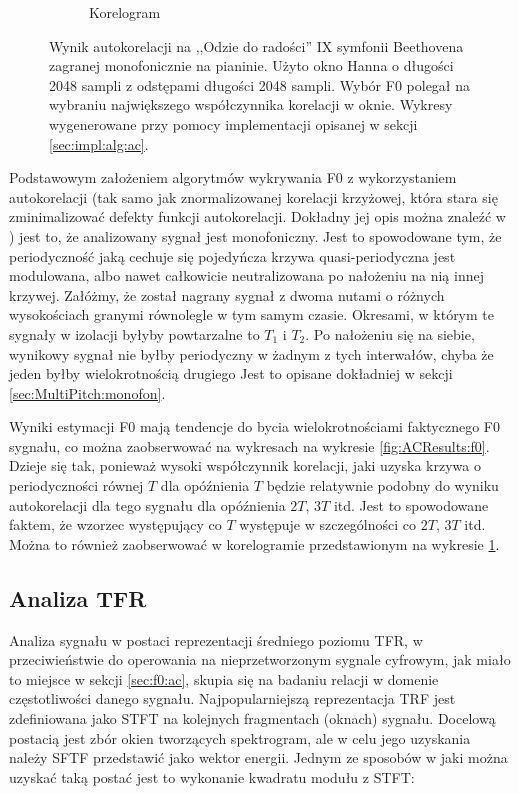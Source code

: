 \documentclass[12pt,a4paper,twoside]{mwart}
\begin{document}
\begin{figure}[t]
\begin{subfigure}{1\textwidth}
    \caption{Korelogram}
    \label{fig:ACResults:corr}
  \end{subfigure}
  \caption{Wynik autokorelacji na ,,Odzie do radości'' IX symfonii Beethovena zagranej monofonicznie na pianinie. Użyto okno Hanna o długości 2048 sampli z odstępami długości 2048 sampli. Wybór F0 polegał na wybraniu największego współczynnika korelacji w oknie. Wykresy wygenerowane przy pomocy implementacji opisanej w sekcji \ref{sec:impl:alg:ac}.}
  \label{fig:ACResults}
\end{figure}

Podstawowym założeniem algorytmów wykrywania F0 z wykorzystaniem autokorelacji (tak samo jak znormalizowanej korelacji krzyżowej, która stara się zminimalizować defekty funkcji autokorelacji. Dokładny jej opis można znaleźć w \cite{Transcription:Talkin:RAPT}) jest to, że analizowany sygnał jest monofoniczny. Jest to spowodowane tym, że periodyczność jaką cechuje się pojedyńcza krzywa quasi-periodyczna jest modulowana, albo nawet całkowicie neutralizowana po nałożeniu na nią innej krzywej. Załóżmy, że został nagrany sygnał z dwoma nutami o różnych wysokościach granymi równolegle w tym samym czasie. Okresami, w którym te sygnały w izolacji byłyby powtarzalne to $T_1$ i $T_2$. Po nałożeniu się na siebie, wynikowy sygnał nie byłby periodyczny w żadnym z tych interwałów, chyba że jeden byłby wielokrotnością drugiego Jest to opisane dokładniej w sekcji \ref{sec:MultiPitch:monofon}.

Wyniki estymacji F0 mają tendencje do bycia wielokrotnościami faktycznego F0 sygnału, co można zaobserwować na wykresach na wykresie \ref{fig:ACResults:f0}. Dzieje się tak, ponieważ wysoki współczynnik korelacji, jaki uzyska krzywa o periodyczności równej $T$ dla opóźnienia $T$ będzie relatywnie podobny do wyniku autokorelacji dla tego sygnału dla opóźnienia $2T$, $3T$ itd. Jest to spowodowane faktem, że wzorzec występujący co $T$ występuje w szczególności co $2T$, $3T$ itd. Można to również zaobserwować w korelogramie przedstawionym na wykresie \ref{fig:ACResults:corr}. \cite[238-250]{Transcription:Anssi:SignalProcessingMethods}

\subsection{Analiza TFR} \label{sec:f0:tfr}
Analiza sygnału w postaci reprezentacji średniego poziomu TFR, w przeciwieństwie do operowania na nieprzetworzonym sygnale cyfrowym, jak miało to miejsce w sekcji \ref{sec:f0:ac}, skupia się na badaniu relacji w domenie częstotliwości danego sygnału. Najpopularniejszą reprezentacja TRF jest zdefiniowana jako STFT na kolejnych fragmentach (oknach) sygnału. Docelową postacią jest zbór okien tworzących spektrogram, ale w celu jego uzyskania należy SFTF przedstawić jako wektor energii. Jednym ze sposobów w jaki można uzyskać taką postać jest to wykonanie kwadratu modułu z STFT:
\end{document}
